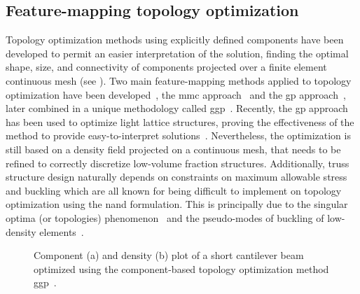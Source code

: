\subsection{Feature-mapping topology optimization}
Topology optimization methods using explicitly defined components have been developed to permit an easier interpretation of the solution, finding the optimal shape, size, and connectivity of components projected over a finite element continuous mesh (see ). Two main feature-mapping methods applied to topology optimization have been developed~, the \gls{mmc} approach~
and the \gls{gp} approach~, later combined in a unique methodology called \gls{ggp}~. Recently, the \gls{gp} approach has been used to optimize light lattice structures, proving the effectiveness of the method to provide easy-to-interpret solutions~. Nevertheless, the optimization is still based on a density field projected on a continuous mesh, that needs to be refined to correctly discretize low-volume fraction structures. Additionally, truss structure design naturally depends on constraints on maximum allowable stress and buckling which are all known for being difficult to implement on topology optimization using the \gls{nand} formulation. This is principally due to the singular optima (or topologies) phenomenon~ and the pseudo-modes of buckling of low-density elements~. \begin{figure}
    \hspace*{\fill}
    \hfill
    \hspace*{\fill}
    \caption{Component (a) and density (b) plot of a short cantilever beam optimized using the component-based topology optimization method \gls{ggp}~\cite{coniglio_generalized_2020}.}
    \label{fig:03_to_component}
\end{figure}

